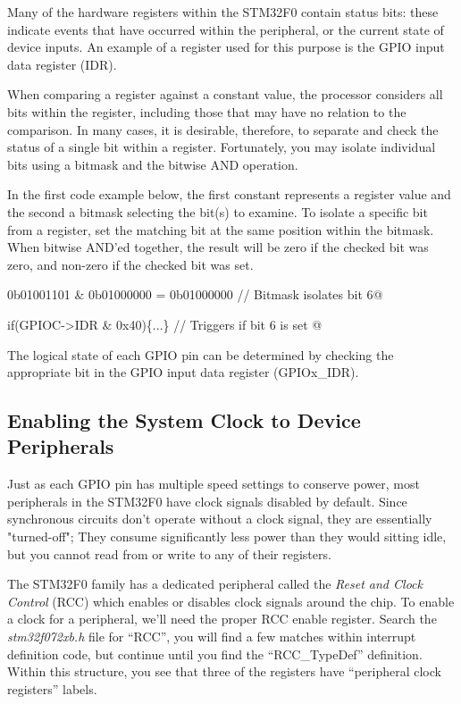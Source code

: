 \documentclass[openany,11pt,fleqn]{book} %
\makeatletter
\newcommand{\ilcode}[1]{
    \begin{center} \parskip=-15pt \colorbox{gray!20!white}{
        \parbox{\columnwidth-2\fboxsep}{
            \lstinline@#1@
        }
    } \end{center}
}
\makeatother
\begin{document}
Many of the hardware registers within the STM32F0 contain status bits: these indicate events that have occurred within the peripheral, or the current state of device inputs. An example of a register used for this purpose is the GPIO input data register (IDR).

When comparing a register against a constant value, the processor considers all bits within the register, including those that may have no relation to the comparison. In many cases, it is desirable, therefore, to separate and check the status of a single bit within a register. Fortunately, you may isolate individual bits using a bitmask and the bitwise AND operation. 

\begin{example} 
In the first code example below, the first constant represents a register value and the second a bitmask selecting the bit(s) to examine. To isolate a specific bit from a register, set the matching bit at the same position within the bitmask. When bitwise AND'ed together, the result will be zero if the checked bit was zero, and non-zero if the checked bit was set. 

\ilcode{0b01001101 \& 0b01000000 = 0b01000000  // Bitmask isolates bit 6}

\ilcode{if(GPIOC->IDR \& 0x40)\{...\} // Triggers if bit 6 is set }
\smallskip
\end{example}

\begin{exercise}
    The logical state of each GPIO pin can be determined by checking the appropriate bit in the GPIO input data register (GPIOx\_IDR). 
    
\end{exercise}    
    
\subsection{Enabling the System Clock to Device Peripherals}

Just as each GPIO pin has multiple speed settings to conserve power, most peripherals in the STM32F0 have clock signals disabled by default. Since synchronous circuits don't operate without a clock signal, they are essentially "turned-off"; They consume significantly less power than they would sitting idle, but you cannot read from or write to any of their registers.

The STM32F0 family has a dedicated peripheral called the \textit{Reset and Clock Control} (RCC) which enables or disables clock signals around the chip. To enable a clock for a peripheral, we'll need the proper RCC enable register. Search the \textit{stm32f072xb.h} file for ``RCC'', you will find a few matches within interrupt definition code, but continue until you find the ``RCC\_TypeDef'' definition. Within this structure, you see that three of the registers have ``peripheral clock registers'' labels.
\end{document}

